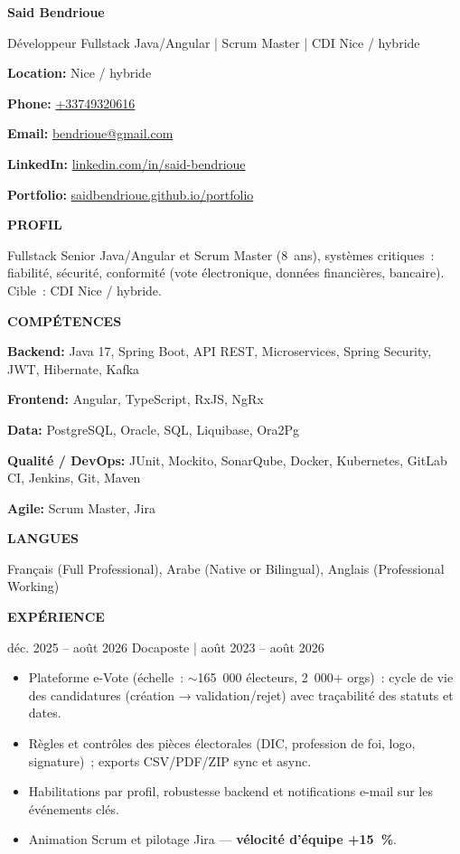 \documentclass[a4paper,10pt]{article}
\newcommand{\atssection}[1]{%
  \par\vspace{9pt}%
  {\large\bfseries\color{accent}\MakeUppercase{#1}}\par
  \vspace{2pt}{\color{accent}\hrule height 0.55pt}\par
  \vspace{5pt}%
}
\newcommand{\contactline}[2]{\noindent\textbf{#1:} #2\par}
\newcommand{\tenure}[1]{ \textcolor{muted}{| #1}}
\newcommand{\skillline}[2]{\noindent\textbf{#1:} #2\par\vspace{1.4pt}}
\begin{document}
{\LARGE\bfseries\color{accent}Said Bendrioue}\par
\vspace{3pt}
{\large Développeur Fullstack Java/Angular | Scrum Master | CDI Nice / hybride}\par
\vspace{8pt}

\contactline{Location}{Nice / hybride}
\contactline{Phone}{\href{tel:+33749320616}{+33749320616}}
\contactline{Email}{\href{mailto:bendrioue@gmail.com}{bendrioue@gmail.com}}
\contactline{LinkedIn}{\href{https://www.linkedin.com/in/said-bendrioue}{linkedin.com/in/said-bendrioue}}
\contactline{Portfolio}{\href{https://saidbendrioue.github.io/portfolio}{saidbendrioue.github.io/portfolio}}

\atssection{Profil}

Fullstack Senior Java/Angular et Scrum Master (8~ans), systèmes critiques~: fiabilité, sécurité, conformité (vote électronique, données financières, bancaire). Cible~: CDI Nice / hybride.

\atssection{Compétences}

\skillline{Backend}{Java 17, Spring Boot, API REST, Microservices, Spring Security, JWT, Hibernate, Kafka}
\skillline{Frontend}{Angular, TypeScript, RxJS, NgRx}
\skillline{Data}{PostgreSQL, Oracle, SQL, Liquibase, Ora2Pg}
\skillline{Qualité / DevOps}{JUnit, Mockito, SonarQube, Docker, Kubernetes, GitLab CI, Jenkins, Git, Maven}
\skillline{Agile}{Scrum Master, Jira}

\atssection{Langues}

Français (Full Professional), Arabe (Native or Bilingual), Anglais (Professional Working)

\atssection{Expérience}

  {déc. 2025 – août 2026}
  {Docaposte\tenure{août 2023 – août 2026}}
  {\begin{itemize}
    \item Plateforme e-Vote (échelle~: $\sim$165~000 électeurs, 2~000+ orgs)~: cycle de vie des candidatures (création → validation/rejet) avec traçabilité des statuts et dates.
    \item Règles et contrôles des pièces électorales (DIC, profession de foi, logo, signature)~; exports CSV/PDF/ZIP sync et async.
    \item Habilitations par profil, robustesse backend et notifications e-mail sur les événements clés.
    \item Animation Scrum et pilotage Jira — \textbf{vélocité d'équipe +15~\%}.
  \end{itemize}}
\end{document}
